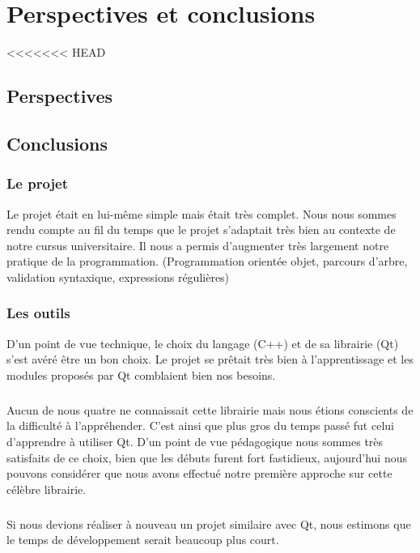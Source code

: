 \chapter{Perspectives et conclusions}
<<<<<<< HEAD
\section{Perspectives}

\section{Conclusions}

\subsection{Le projet}
Le projet était en lui-même simple mais était très complet. Nous nous sommes rendu compte au fil du temps que le projet s'adaptait très bien au contexte de notre cursus universitaire. Il nous a permis d'augmenter très largement notre pratique de la programmation. (Programmation orientée objet, parcours d’arbre, validation syntaxique, expressions régulières)


\subsection{Les outils}
D'un point de vue technique, le choix du langage (C++) et de sa librairie (Qt) s’est avéré être un bon choix. Le projet se prêtait très bien à l’apprentissage et les modules proposés par Qt comblaient bien nos besoins.

\paragraph{}
Aucun de nous quatre ne connaissait cette librairie mais nous étions conscients de la difficulté à l'appréhender. C'est ainsi que plus gros du temps passé fut celui d'apprendre à utiliser Qt. D'un point de vue pédagogique nous sommes très satisfaits de ce choix, bien que les débuts furent fort fastidieux, aujourd'hui nous pouvons considérer que nous avons effectué notre première approche sur cette célèbre librairie.
\paragraph{}

Si nous devions réaliser à nouveau un projet similaire avec Qt, nous estimons que le temps de développement serait beaucoup plus court.

